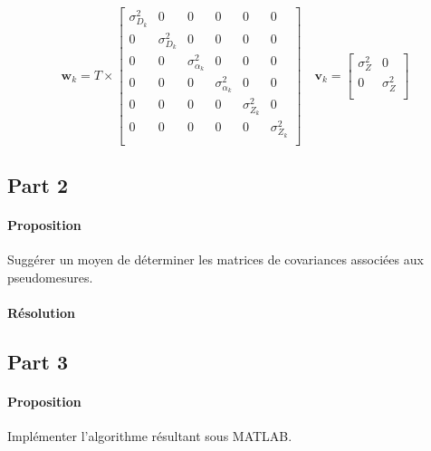 \documentclass{article}
\begin{document}
\begin{equation}
    \mathbf{w}_{k} = T \times 
    \begin{bmatrix}
        \sigma_{D_{k}}^2 & 0 & 0 & 0 & 0 & 0\\
        0 & \sigma_{D_{k}}^2 & 0 & 0 & 0 & 0\\
        0 & 0 & \sigma_{\alpha_{k}}^2 & 0 & 0 & 0\\
        0 & 0 & 0 & \sigma_{\alpha_{k}}^2 & 0 & 0\\
        0 & 0 & 0 & 0 & \sigma_{Z_{k}}^2 & 0\\
        0 & 0 & 0 & 0 & 0 & \sigma_{Z_{k}}^2\\
    \end{bmatrix}
    \quad
    \mathbf{v}_{k} = 
    \begin{bmatrix}
        \sigma_{Z}^2 & 0\\
        0 & \sigma_{Z}^2\\
    \end{bmatrix}
\end{equation}

\subsection{Part 2}
\paragraph{Proposition}Suggérer un moyen de déterminer les matrices de covariances associées aux pseudomesures.

\paragraph{Résolution}



\subsection{Part 3}
\paragraph{Proposition}Implémenter l'algorithme résultant sous MATLAB.
\end{document}
